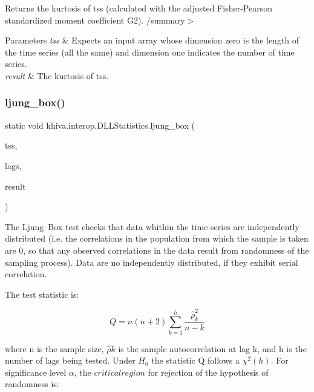 Returns the kurtosis of tss (calculated with the adjusted Fisher-\/\+Pearson standardized moment coefficient G2). /summary$>$ 
\begin{DoxyParams}{Parameters}
{\em tss} & Expects an input array whose dimension zero is the length of the time series (all the same) and dimension one indicates the number of time series.\\
\hline
{\em result} & The kurtosis of tss.\\
\hline
\end{DoxyParams}


\mbox{\label{classkhiva_1_1interop_1_1_d_l_l_statistics_a3af99a17a16f48d5d0914d69101385cf}} 
\subsubsection{\texorpdfstring{ljung\+\_\+box()}{ljung\_box()}}
{\footnotesize\ttfamily static void khiva.\+interop.\+D\+L\+L\+Statistics.\+ljung\+\_\+box (\begin{DoxyParamCaption}\item[{\mbox{[}\+In\mbox{]} ref Int\+Ptr}]{tss,  }\item[{\mbox{[}\+In\mbox{]} ref long}]{lags,  }\item[{\mbox{[}\+Out\mbox{]} out Int\+Ptr}]{result }\end{DoxyParamCaption})\hspace{0.3cm}{\ttfamily [static]}}



The Ljung–\+Box test checks that data whithin the time series are independently distributed (i.\+e. the correlations in the population from which the sample is taken are 0, so that any observed correlations in the data result from randomness of the sampling process). Data are no independently distributed, if they exhibit serial correlation. 

The test statistic is\+:

\[ Q = n\left(n+2\right)\sum_{k=1}^h\frac{\hat{\rho}^2_k}{n-k} \]

where \textquotesingle{}\textquotesingle{}n\textquotesingle{}\textquotesingle{} is the sample size, $\hat{\rho}k $ is the sample autocorrelation at lag \textquotesingle{}\textquotesingle{}k\textquotesingle{}\textquotesingle{}, and \textquotesingle{}\textquotesingle{}h\textquotesingle{}\textquotesingle{} is the number of lags being tested. Under $ H_0 $ the statistic Q follows a $\chi^2{(h)} $. For significance level $\alpha$, the $critical region$ for rejection of the hypothesis of randomness is\+:


